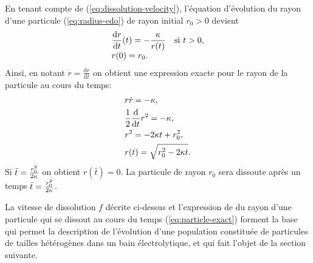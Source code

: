 En tenant compte de (\ref{eq:dissolution-velocity}), l'équation
d'évolution du rayon d'une particule (\ref{eq:radius-edo}) de rayon initial $r_0 > 0$
 devient
\begin{align}\label{eq:radius-edo-cst-diss-rate}
  \begin{array}{l}
    \displaystyle\frac{\mathrm d r}{\mathrm d t}(t) = -\displaystyle\frac{\kappa}{r(t)} \quad \text{si } t
    > 0,\\[0.5\normalbaselineskip]
    r(0) = r_0.
  \end{array}
\end{align}
Ainsi, en notant $\dot r = \frac{\mathrm dr}{\mathrm dt}$ on obtient
une expression exacte pour le rayon de la particule au cours du temps:
\begin{align}
  &r\dot r = -\kappa,\nonumber\\
  &\frac{1}{2}\frac{\mathrm d}{\mathrm dt}r^2 = -\kappa,\nonumber\\
  &r^2 = -2\kappa t + r_0^2,\nonumber\\
  &r(t) = \sqrt{r_0^2-2\kappa t}.\label{eq:particle-exact}
\end{align}
Si $\bar t = \frac{r_0^2}{2\kappa}$ on obtient $r(\bar
t) = 0$. La particule de rayon $r_0$ sera dissoute après un temps $\bar
t = \frac{r_0^2}{2\kappa}$.

La vitesse de dissolution $f$ décrite ci-dessus et l'expression de
du rayon d'une particule qui se dissout au cours du temps
(\ref{eq:particle-exact}) forment la base qui permet la description de
l'évolution d'une population constituée de particules de tailles
hétérogènes dans un bain électrolytique, et qui fait l'objet de la
section suivante.
